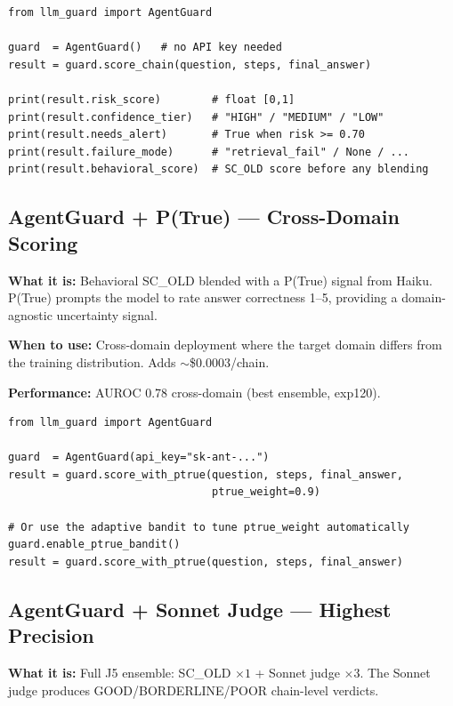 \documentclass[11pt,a4paper]{article}
\begin{document}
\begin{lstlisting}
from llm_guard import AgentGuard

guard  = AgentGuard()   # no API key needed
result = guard.score_chain(question, steps, final_answer)

print(result.risk_score)        # float [0,1]
print(result.confidence_tier)   # "HIGH" / "MEDIUM" / "LOW"
print(result.needs_alert)       # True when risk >= 0.70
print(result.failure_mode)      # "retrieval_fail" / None / ...
print(result.behavioral_score)  # SC_OLD score before any blending
\end{lstlisting}

\subsection{AgentGuard + P(True) --- Cross-Domain Scoring}

\textbf{What it is:} Behavioral SC\_OLD blended with a P(True) signal from
Haiku. P(True) prompts the model to rate answer correctness 1--5, providing
a domain-agnostic uncertainty signal.

\textbf{When to use:} Cross-domain deployment where the target domain differs
from the training distribution. Adds $\sim$\$0.0003/chain.

\textbf{Performance:} AUROC 0.78 cross-domain (best ensemble, exp120).

\begin{lstlisting}
from llm_guard import AgentGuard

guard  = AgentGuard(api_key="sk-ant-...")
result = guard.score_with_ptrue(question, steps, final_answer,
                                ptrue_weight=0.9)

# Or use the adaptive bandit to tune ptrue_weight automatically
guard.enable_ptrue_bandit()
result = guard.score_with_ptrue(question, steps, final_answer)
\end{lstlisting}

\subsection{AgentGuard + Sonnet Judge --- Highest Precision}

\textbf{What it is:} Full J5 ensemble: SC\_OLD $\times 1$ + Sonnet judge
$\times 3$. The Sonnet judge produces GOOD/BORDERLINE/POOR chain-level verdicts.
\end{document}
